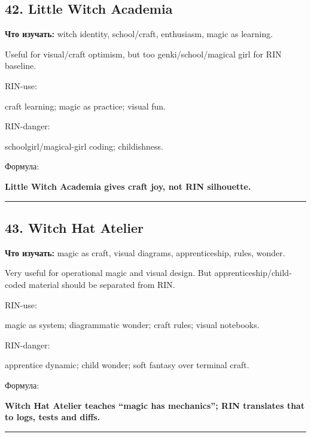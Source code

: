 \subsection*{42. Little Witch Academia}

\textbf{Что изучать:} witch identity, school/\hspace{0pt}craft, enthusiasm, magic as
learning.

Useful for visual/\hspace{0pt}craft optimism, but too genki/\hspace{0pt}school/\hspace{0pt}magical girl for
RIN baseline.

RIN-use:

craft learning; magic as practice; visual fun.

RIN-danger:

schoolgirl/\hspace{0pt}magical-girl coding; childishness.

Формула:

\textbf{Little Witch Academia gives craft joy, not RIN silhouette.}

\begin{center}\rule{0.5\linewidth}{0.5pt}\end{center}

\subsection*{43. Witch Hat Atelier}

\textbf{Что изучать:} magic as craft, visual diagrams, apprenticeship,
rules, wonder.

Very useful for operational magic and visual design. But
apprenticeship/\hspace{0pt}child-coded material should be separated from RIN.

RIN-use:

magic as system; diagrammatic wonder; craft rules; visual notebooks.

RIN-danger:

apprentice dynamic; child wonder; soft fantasy over terminal craft.

Формула:

\textbf{Witch Hat Atelier teaches ``magic has mechanics''; RIN
translates that to logs, tests and diffs.}

\begin{center}\rule{0.5\linewidth}{0.5pt}\end{center}

